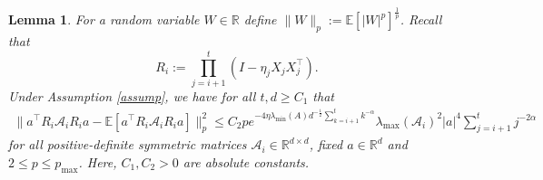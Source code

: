 \documentclass[11pt, reqno,english]{amsart}
\newtheorem{lemma}{Lemma}[section]
\begin{document}
\begin{lemma}\label{conc2}
For a random variable $W \in \mathbb{R}$ define $\|W\|_p := \mathbb{E}[|W|^p]^{\frac{1}{p}}$. 
Recall that $$R_i := \prod_{j = i+1}^{t} (I - \eta_{j}X_{j}X^\top_{j}).$$ Under Assumption \ref{assump}, we have for all $t, d \geq C_1$ that
\begin{align*}
\|a^\top R_i \mathcal A_i R_i a - \mathbb{E}[a^\top R_i \mathcal A_i R_i a]\|^2_p 
\leq C_2pe^{- 4\eta \lambda_{\min}(A)d^{-\frac{1}{2}}\sum_{k = i+1}^t k^{-\alpha}}\lambda_{\max}(\mathcal A_i)^2 |a|^4 \sum_{j = i+1}^t j^{-2\alpha}
\end{align*}
for all positive-definite symmetric matrices $\mathcal A_i \in \mathbb{R}^{d \times d}$, fixed $a \in \mathbb{R}^d$ and $2 \leq p \leq p_{\max}$. Here, $C_1, C_2>0$ are absolute constants.
\end{lemma}
\end{document}
